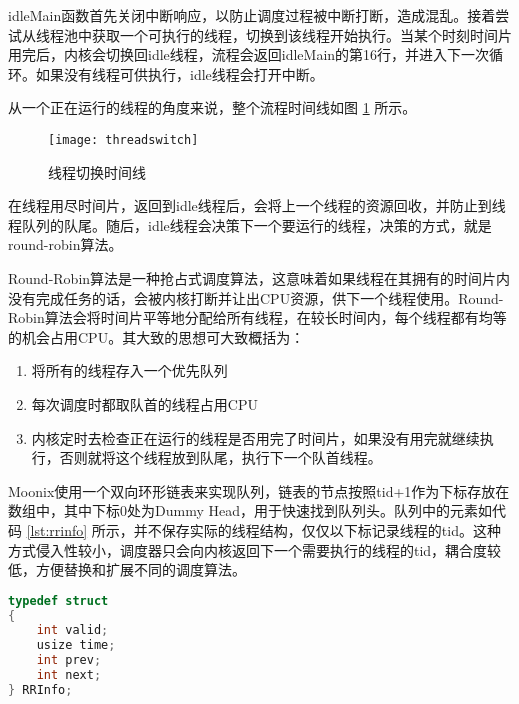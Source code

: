 idleMain函数首先关闭中断响应，以防止调度过程被中断打断，造成混乱。接着尝试从线程池中获取一个可执行的线程，切换到该线程开始执行。当某个时刻时间片用完后，内核会切换回idle线程，流程会返回idleMain的第16行，并进入下一次循环。如果没有线程可供执行，idle线程会打开中断。

从一个正在运行的线程的角度来说，整个流程时间线如图 \ref{pic:threadswitch} 所示。

\begin{figure}[htpb]
	\centering
	\texttt{[image: threadswitch]}
	\setlength{\abovecaptionskip}{2pt}
	\caption{线程切换时间线}
	\label{pic:threadswitch}
\end{figure}

在线程用尽时间片，返回到idle线程后，会将上一个线程的资源回收，并防止到线程队列的队尾。随后，idle线程会决策下一个要运行的线程，决策的方式，就是round-robin算法。

Round-Robin算法是一种抢占式调度算法，这意味着如果线程在其拥有的时间片内没有完成任务的话，会被内核打断并让出CPU资源，供下一个线程使用。Round-Robin算法会将时间片平等地分配给所有线程，在较长时间内，每个线程都有均等的机会占用CPU。其大致的思想可大致概括为：

\begin{enumerate}
	\item 将所有的线程存入一个优先队列
	\item 每次调度时都取队首的线程占用CPU
	\item 内核定时去检查正在运行的线程是否用完了时间片，如果没有用完就继续执行，否则就将这个线程放到队尾，执行下一个队首线程。
\end{enumerate}

Moonix使用一个双向环形链表来实现队列，链表的节点按照tid+1作为下标存放在数组中，其中下标0处为Dummy Head，用于快速找到队列头。队列中的元素如代码 \ref{lst:rrinfo} 所示，并不保存实际的线程结构，仅仅以下标记录线程的tid。这种方式侵入性较小，调度器只会向内核返回下一个需要执行的线程的tid，耦合度较低，方便替换和扩展不同的调度算法。

\begin{lstlisting}[language={C}, caption={线程调度器元素}, label={lst:rrinfo}]
typedef struct
{
	int valid;
	usize time;
	int prev;
	int next;
} RRInfo;
\end{lstlisting}